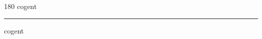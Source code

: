 
\begin{frame}
\begin{center}
\begin{turn}{180}
{\fontsize{2.5cm}{1em}\selectfont cogent}
\end{turn}
\vspace{1em}\par  
\hrule
\vspace{1em}\par  
{\fontsize{2.5cm}{1em}\selectfont cogent}
\end{center}
\end{frame}
